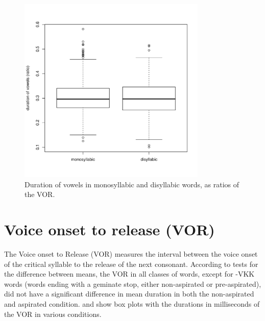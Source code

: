 \documentclass[11pt,a4paper,oneside,openany]{memoir}\usepackage[]{graphicx}\usepackage[]{color}
\newenvironment{knitrout}{}{} %
\begin{document}
\begin{figure}
\centering
\begin{knitrout}
\color{fgcolor}
\includegraphics[width=0.8\textwidth]{img/voic-syll-box-1} 

\end{knitrout}
\caption{Duration of vowels in monosyllabic and disyllabic words, as ratios of the VOR.}
\label{f:vvpsyll}
\end{figure}

\section{Voice onset to release (VOR)}
\label{s:vor}



The Voice onset to Release (VOR) measures the interval between the voice onset of the critical syllable to the release of the next consonant.
According to tests for the difference between means, the VOR in all classes of words, except for -VKK words (words ending with a geminate stop, either non-aspirated or pre-aspirated), did not have a significant difference in mean duration in both the non-aspirated and aspirated condition.
 and  show box plots with the durations in milliseconds of the VOR in various conditions.


\end{document}
